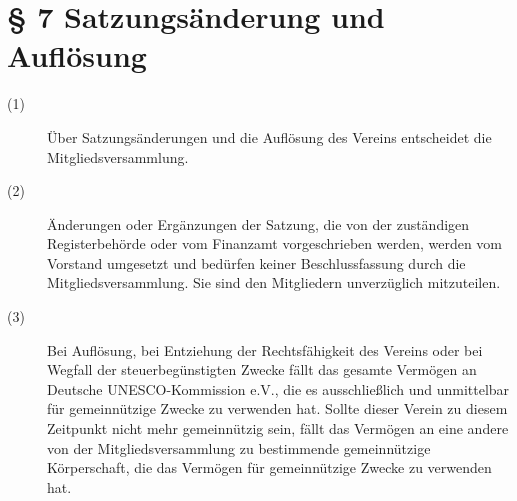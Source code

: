 \documentclass[a4paper,12pt]{scrartcl}
\begin{document}
\section*{\S{} 7 Satzungsänderung und Auflösung}
\begin{description} 

\item[(1)] Über Satzungsänderungen und die Auflösung des Vereins entscheidet die Mitgliedsversammlung.
\item[(2)] Änderungen oder Ergänzungen der Satzung, die von der zuständigen Registerbehörde oder vom Finanzamt vorgeschrieben werden, werden vom Vorstand umgesetzt und bedürfen keiner Beschlussfassung durch die Mitgliedsversammlung. Sie sind den Mitgliedern unverzüglich mitzuteilen.
\item[(3)] Bei Auflösung, bei Entziehung der Rechtsfähigkeit des Vereins oder bei Wegfall der steuerbegünstigten Zwecke fällt das gesamte Vermögen an Deutsche UNESCO-Kommission e.V., die es ausschließlich und unmittelbar für gemeinnützige Zwecke zu verwenden hat. Sollte dieser Verein zu diesem Zeitpunkt nicht mehr gemeinnützig sein, fällt das Vermögen an eine andere von der Mitgliedsversammlung zu bestimmende gemeinnützige Körperschaft, die das Vermögen für gemeinnützige Zwecke zu verwenden hat.

\end{description}
\end{document}
